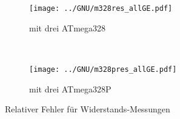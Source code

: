 \begin{figure}[H]
  \begin{subfigure}[b]{.5\textwidth}
    \centering
    \texttt{[image: ../GNU/m328res\_allGE.pdf]}
    \caption{mit drei ATmega328}
    \label{fig:m328res_all}
  \end{subfigure}
  ~
  \begin{subfigure}[b]{.5\textwidth}
    \centering
    \texttt{[image: ../GNU/m328pres\_allGE.pdf]}
    \caption{mit drei ATmega328P}
    \label{fig:m328pres_all}
  \end{subfigure}
\caption{Relativer Fehler für Widerstands-Messungen}
\end{figure}

